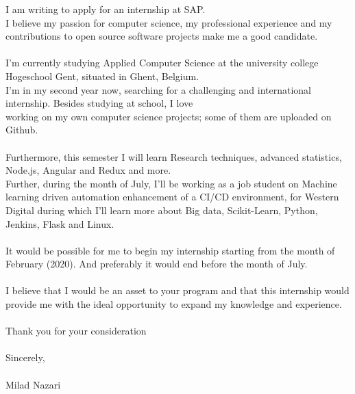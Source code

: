 \documentclass[a4paper, twoside]{article}
\begin{document}
    \noindent I am writing to apply for an internship at SAP.\\
    I believe my passion for computer science, my professional experience and my 
    contributions to open source software projects make me a good candidate.
    \\\\
    \noindent I'm currently studying Applied Computer Science at the university college 
    Hogeschool Gent, situated in Ghent, Belgium.\\
    I'm in my second year now, searching for a challenging and international internship. 
    Besides studying at school, I love\\ working on my own computer science projects; some 
    of them are uploaded on Github.
    \\\\
    \noindent Furthermore, this semester I will learn Research techniques, advanced statistics, Node.js, Angular and Redux and more.\\
    Further, during the month of July, I'll be working
    as a job student on Machine learning driven automation enhancement of a CI/CD environment, for 
    Western Digital during which I'll learn more about Big data, Scikit-Learn, Python, Jenkins, 
    Flask and Linux.
    \\\\
    It would be possible for me to begin my internship starting from the month of February (2020). 
    And preferably it would end before the month of July.
    \\\\
    \noindent I believe that I would be an asset to your program and that this internship 
    would provide me with the ideal opportunity to expand my knowledge and experience. 
    \\\\
    \noindent Thank you for your consideration
    \\\\
    \noindent Sincerely,
    \\\\
    \noindent Milad Nazari
\end{document}
